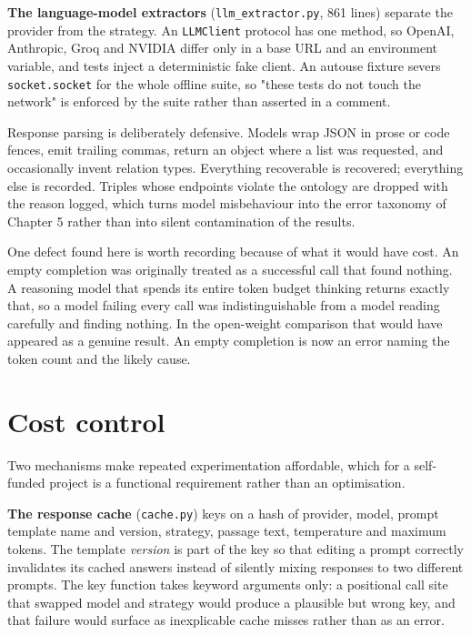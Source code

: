\documentclass[11pt,a4paper,oneside]{report}
\begin{document}
\textbf{The language-model extractors} (\texttt{llm\_\allowbreak{}extractor.\allowbreak{}py}, 861 lines) separate the provider from the strategy. An \texttt{LLMClient} protocol has one method, so OpenAI, Anthropic, Groq and NVIDIA differ only in a base URL and an environment variable, and tests inject a deterministic fake client. An autouse fixture severs \texttt{socket.\allowbreak{}socket} for the whole offline suite, so "these tests do not touch the network" is enforced by the suite rather than asserted in a comment.

Response parsing is deliberately defensive. Models wrap JSON in prose or code fences, emit trailing commas, return an object where a list was requested, and occasionally invent relation types. Everything recoverable is recovered; everything else is recorded. Triples whose endpoints violate the ontology are dropped with the reason logged, which turns model misbehaviour into the error taxonomy of Chapter 5 rather than into silent contamination of the results.

One defect found here is worth recording because of what it would have cost. An empty completion was originally treated as a successful call that found nothing. A reasoning model that spends its entire token budget thinking returns exactly that, so a model failing every call was indistinguishable from a model reading carefully and finding nothing. In the open-weight comparison that would have appeared as a genuine result. An empty completion is now an error naming the token count and the likely cause.

\section{Cost control}

Two mechanisms make repeated experimentation affordable, which for a self-funded project is a functional requirement rather than an optimisation.

\textbf{The response cache} (\texttt{cache.\allowbreak{}py}) keys on a hash of provider, model, prompt template name and version, strategy, passage text, temperature and maximum tokens. The template \emph{version} is part of the key so that editing a prompt correctly invalidates its cached answers instead of silently mixing responses to two different prompts. The key function takes keyword arguments only: a positional call site that swapped model and strategy would produce a plausible but wrong key, and that failure would surface as inexplicable cache misses rather than as an error.
\end{document}
